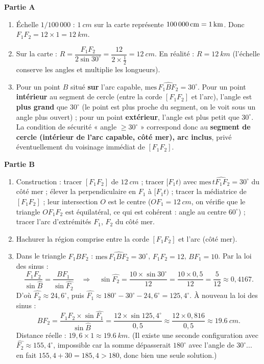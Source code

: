 \documentclass[11pt]{article}
\begin{document}
\begin{corrige}
\textbf{Partie A}
\begin{enumerate}
\item Échelle $1/100\,000$ : $\SI{1}{cm}$ sur la carte représente $\SI{100\,000}{cm} = \SI{1}{km}$. Donc $F_1F_2 = 12 \times 1 = \SI{12}{km}$.
\item Sur la carte : $R = \dfrac{F_1F_2}{2\sin 30^{\circ}} = \dfrac{12}{2 \times \frac{1}{2}} = \SI{12}{cm}$. En réalité : $R = \SI{12}{km}$ (l'échelle conserve les angles et multiplie les longueurs).
\item Pour un point $B$ situé \textbf{sur} l'arc capable, $\mathrm{mes}\,\widehat{F_1BF_2} = 30^{\circ}$. Pour un point \textbf{intérieur} au segment de cercle (entre la corde $[F_1F_2]$ et l'arc), l'angle est \textbf{plus grand} que $30^{\circ}$ (le point est plus proche du segment, on le voit sous un angle plus ouvert) ; pour un point \textbf{extérieur}, l'angle est plus petit que $30^{\circ}$. La condition de sécurité « angle $\geq 30^{\circ}$ » correspond donc au \textbf{segment de cercle (intérieur de l'arc capable, côté mer), arc inclus}, privé éventuellement du voisinage immédiat de $[F_1F_2]$.
\end{enumerate}

\textbf{Partie B}
\begin{enumerate}
\item Construction : tracer $[F_1F_2]$ de $\SI{12}{cm}$ ; tracer $[F_1t)$ avec $\mathrm{mes}\,\widehat{tF_1F_2} = 30^{\circ}$ du côté mer ; élever la perpendiculaire en $F_1$ à $[F_1t)$ ; tracer la médiatrice de $[F_1F_2]$ ; leur intersection $O$ est le centre ($OF_1 = \SI{12}{cm}$, on vérifie que le triangle $OF_1F_2$ est équilatéral, ce qui est cohérent : angle au centre $60^{\circ}$) ; tracer l'arc d'extrémités $F_1$, $F_2$ du côté mer.
\item Hachurer la région comprise entre la corde $[F_1F_2]$ et l'arc (côté mer).
\item Dans le triangle $F_1BF_2$ : $\mathrm{mes}\,\widehat{F_1BF_2} = 30^{\circ}$, $F_1F_2 = 12$, $BF_1 = 10$. Par la loi des sinus :
\[ \frac{F_1F_2}{\sin \widehat{B}} = \frac{BF_1}{\sin \widehat{F_2}} \quad\Longrightarrow\quad \sin \widehat{F_2} = \frac{10 \times \sin 30^{\circ}}{12} = \frac{10 \times 0{,}5}{12} = \frac{5}{12} \approx 0{,}4167. \]
D'où $\widehat{F_2} \approx 24{,}6^{\circ}$, puis $\widehat{F_1} \approx 180^{\circ} - 30^{\circ} - 24{,}6^{\circ} = 125{,}4^{\circ}$. À nouveau la loi des sinus :
\[ BF_2 = \frac{F_1F_2 \times \sin \widehat{F_1}}{\sin \widehat{B}} = \frac{12 \times \sin 125{,}4^{\circ}}{0{,}5} \approx \frac{12 \times 0{,}816}{0{,}5} \approx \SI{19,6}{cm}. \]
Distance réelle : $19{,}6 \times 1 \approx \SI{19,6}{km}$. (Il existe une seconde configuration avec $\widehat{F_2} \approx 155{,}4^{\circ}$, impossible car la somme dépasserait $180^{\circ}$ avec l'angle de $30^{\circ}$... en fait $155{,}4 + 30 = 185{,}4 > 180$, donc bien une seule solution.)
\end{enumerate}


\end{corrige}
\end{document}
